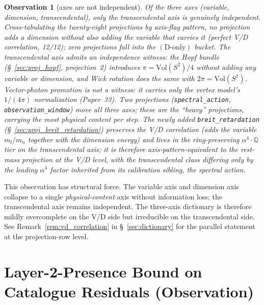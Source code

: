 \documentclass[11pt]{article}
\newtheorem{observation}{Observation}
\begin{document}
\begin{observation}[axes are not independent]
\label{obs:axes_correlated}
Of the three axes (variable, dimension, transcendental), only the
transcendental axis is genuinely independent.  Cross-tabulating the
twenty-eight projections by axis-flag pattern, no projection adds a
dimension without also adding the variable that carries it (perfect
V/D correlation, 12/12); zero projections fall into the
$(\text{D-only})$ bucket.  The transcendental axis admits an
independence witness: the Hopf bundle (\S~\ref{sec:proj_hopf},
projection~2) introduces $\pi = \mathrm{Vol}(S^2)/4$ without adding any
variable or dimension, and Wick rotation does the same with
$2\pi = \mathrm{Vol}(S^1)$.  Vector-photon promotion is not a witness:
it carries only the vertex model's $1/(4\pi)$ normalization
(Paper~33).  Two projections (\texttt{spectral\_action},
\texttt{observation\_window}) move all three axes; these are the
``heavy'' projections, carrying the most physical content per step.
The newly added \texttt{breit\_retardation}
(\S~\ref{sec:proj_breit_retardation}) preserves the V/D correlation
(adds the variable $m_l/m_n$ together with the dimension energy)
and lives in the ring-preserving $\alpha^4 \cdot \mathbb{Q}$ tier on
the transcendental axis; it is therefore axis-pattern-equivalent to
the rest-mass projection at the V/D level, with the transcendental
class differing only by the leading $\alpha^4$ factor inherited from
its calibration sibling, the spectral action.
\end{observation}

This observation has structural force.  The variable axis and
dimension axis collapse to a single \emph{physical-content} axis
without information loss; the transcendental axis remains
independent.  The three-axis dictionary is therefore mildly
overcomplete on the V/D side but irreducible on the
transcendental side.  See Remark~\ref{rem:vd_correlation} in
\S~\ref{sec:dictionary} for the parallel statement at the
projection-row level.

\section{Layer-2-Presence Bound on Catalogue Residuals (Observation)}
\label{sec:prediction}
\end{document}

